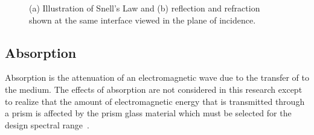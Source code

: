 \begin{figure}[htb]		%
\begin{center}
\caption{(a) Illustration of Snell's Law and (b) reflection and refraction shown at the same interface viewed in the plane of incidence.}
\end{center}
\end{figure}

\subsection{Absorption}
\label{sec:Absorption}
Absorption is the attenuation of an electromagnetic wave due to the transfer of to the medium. The effects of absorption are not considered in this research except to realize that the amount of electromagnetic energy that is transmitted through a prism is affected by the prism glass material which must be selected for the design spectral range~\cite[pp. 67-68]{Hecht}.



